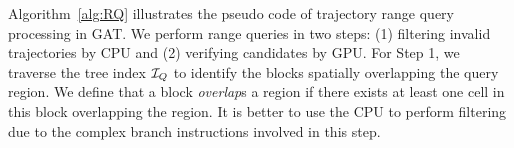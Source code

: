\documentclass[10pt,conference,letterpaper]{IEEEtran}
\newcommand{\frname}{GAT\xspace }
\newcommand{\rangecand}{{{\cal Q}_r^c}\xspace}
\newcommand{\treeindex}{{{\cal I}_Q}\xspace}
\newcommand{\eat}[1]{}
\begin{document}
\eat{
	\begin{algorithm}[t]
		\algsetup{linenosize=\tiny}
		\small
		\caption{Verification on GPU}
		\label{alg:verifyTrajRQ}
		\begin{algorithmic}[1]
			\REQUIRE ~~\\
			query region $R$; candidate blocks $\rangecand$; number of threads in a CUDA block $N_{th}$
			\ENSURE ~~\\
			result bitmap ${\cal B}_r$;
			\FOR{each CUDA block $bID \in [0,size(\rangecand)-1]$ \textbf{parallelly}}
				\STATE ${\cal P} \leftarrow$ extractPoints();
				\FOR{$i\in [0,size({\cal P})/N_{th}-1]$}
					\FOR{each CUDA thread $thID \in [0,N_{th}-1]$ \textbf{parallelly}}
						\STATE $p \leftarrow {\cal P}[i*N_{th} + thID]$;
						\IF{$p\in R$}
							\STATE ${\cal B}_r[p.tID]\leftarrow TRUE$;
						\ENDIF
					\ENDFOR
				\ENDFOR
			\ENDFOR
			\RETURN ${\cal B}_r$
		\end{algorithmic}
	\end{algorithm}
}



Algorithm~\ref{alg:RQ} illustrates the pseudo code of trajectory range query processing in \frname. We perform range queries in two steps: (1) filtering invalid trajectories by CPU and
(2) verifying candidates by GPU. For Step 1, we traverse the tree index $\treeindex$ to identify the blocks spatially overlapping the query region. We define that a block \emph{overlap}s a region if there exists at least one cell in this block overlapping the region.
It is better to use the CPU to perform filtering due to the complex branch instructions involved in this step.

\end{document}
